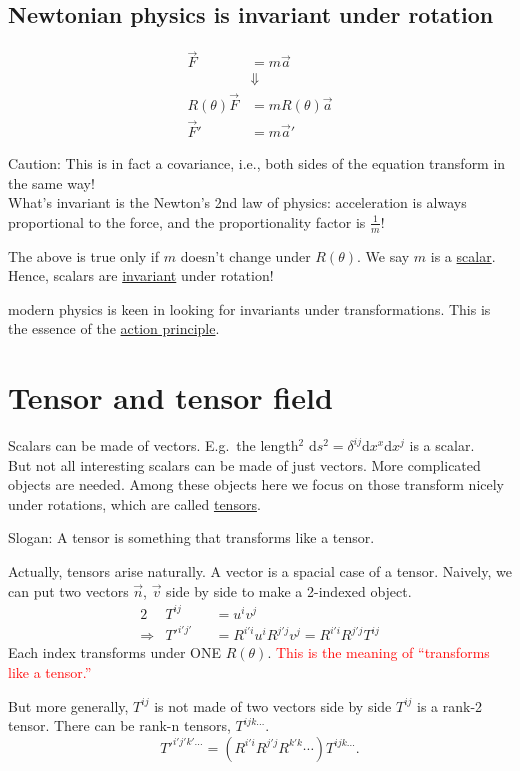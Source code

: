 \documentclass[11pt,fleqn]{book} %
\begin{document}
\subsection{Newtonian physics is invariant under rotation}
\begin{align*}
  \vec{F}           &= m \vec{a}           \\
                    &\Downarrow            \\
  R(\theta) \vec{F} &= m R(\theta) \vec{a} \\
  \vec{F}'          &= m \vec{a}'
\end{align*}
\begin{emphbox}
  Caution: This is in fact a covariance, i.e., both sides of the equation
  transform in the same way! \\
  What's invariant is the Newton's 2nd law of physics: acceleration is always
  proportional to the force, and the proportionality factor is \(\frac{1}{m}\)!
\end{emphbox}
The above is true only if \(m\) doesn't change under \(R(\theta)\). We say \(m\)
is a \uline{scalar}. \\
Hence, scalars are \uline{invariant} under rotation!
\begin{remark}
  modern physics is keen in looking for invariants under transformations. This
  is the essence of the \uline{action principle}.
\end{remark}

\section{Tensor and tensor field}
Scalars can be made of vectors.
E.g.\ the length\(^2\) \(\mathrm{d}s^2 = \delta^{ij} \mathrm{d}x^x
\mathrm{d}x^j\) is a scalar. \\
But not all interesting scalars can be made of just vectors. More complicated
objects are needed. Among these objects here we focus on those transform nicely
under rotations, which are called \uline{tensors}.
\begin{emphbox}
  Slogan: A tensor is something that transforms like a tensor.
\end{emphbox}
\begin{remark}
  Actually, tensors arise naturally. A vector is a spacial case of a tensor.
  Naively, we can put two vectors \(\vec{n}\), \(\vec{v}\) side by side to make a
  2-indexed object.
  \begin{alignat*}{2}
    & T^{ij} &&= u^i v^j \\
    \Rightarrow & T'^{i'j'} &&= R^{i'i} u^i R^{j'j} v^j = R^{i'i} R^{j'j} T^{ij}
  \end{alignat*}
  Each index transforms under \uppercase{one} \(R(\theta)\). \textcolor{red}{This is the meaning of
  ``transforms like a tensor.''}
\end{remark}
But more generally, \(T^{ij}\) is not made of two vectors side by side
\(T^{ij}\) is a rank-2 tensor. There can be rank-n tensors, \(T^{ijk\dots}\).
\[T'^{i'j'k'\dots} = \left(R^{i'i} R^{j'j} R^{k'k} \cdots\right) T^{ijk\dots}.\]
\end{document}
